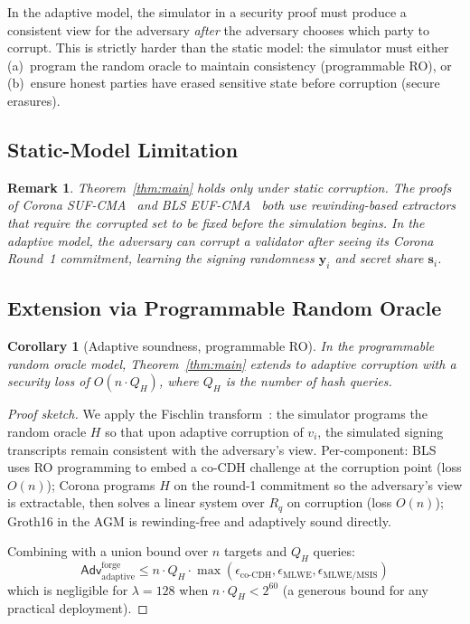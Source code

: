 \documentclass[11pt]{article}
\newtheorem{corollary}[theorem]{Corollary}
\newtheorem{remark}{Remark}
\begin{document}
In the adaptive model, the simulator in a security proof must produce
a consistent view for the adversary \emph{after} the adversary chooses
which party to corrupt.  This is strictly harder than the static model:
the simulator must either (a)~program the random oracle to maintain
consistency (programmable RO), or (b)~ensure honest parties have
erased sensitive state before corruption (secure erasures).

\subsection{Static-Model Limitation}

\begin{remark}
Theorem~\ref{thm:main} holds only under static corruption.  The proofs
of Corona SUF-CMA~\cite{corona} and BLS
EUF-CMA~\cite{boneh2001short} both use rewinding-based extractors
that require the corrupted set to be fixed before the simulation
begins.  In the adaptive model, the adversary can corrupt a validator
\emph{after} seeing its Corona Round~1 commitment, learning the
signing randomness $\mathbf{y}_i$ and secret share $\mathbf{s}_i$.
\end{remark}

\subsection{Extension via Programmable Random Oracle}

\begin{corollary}[Adaptive soundness, programmable RO]
\label{cor:adaptive-pro}
In the programmable random oracle model, Theorem~\ref{thm:main} extends
to adaptive corruption with a security loss of $O(n \cdot Q_H)$, where
$Q_H$ is the number of hash queries.
\end{corollary}

\begin{proof}[Proof sketch]
We apply the Fischlin transform~\cite{fischlin2005}: the simulator
programs the random oracle $H$ so that upon adaptive corruption of
$v_i$, the simulated signing transcripts remain consistent with the
adversary's view.  Per-component: BLS uses RO programming to embed a
co-CDH challenge at the corruption point (loss $O(n)$); Corona
programs $H$ on the round-1 commitment so the adversary's view is
extractable, then solves a linear system over $R_q$ on corruption
(loss $O(n)$); Groth16 in the AGM is rewinding-free and adaptively
sound directly.

Combining with a union bound over $n$ targets and $Q_H$ queries:
\[
  \mathsf{Adv}^{\text{forge}}_{\text{adaptive}} \leq
  n \cdot Q_H \cdot \max(\epsilon_{\text{co-CDH}},
  \epsilon_{\text{MLWE}}, \epsilon_{\text{MLWE/MSIS}})
\]
which is negligible for $\lambda = 128$ when $n \cdot Q_H < 2^{60}$
(a generous bound for any practical deployment).
\end{proof}
\end{document}
